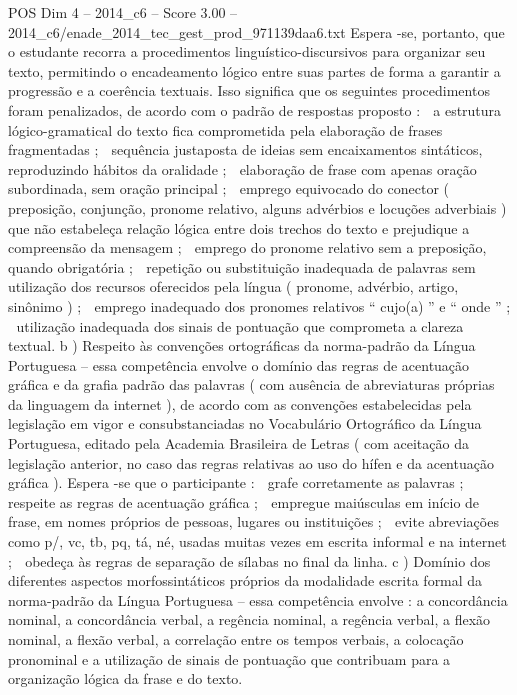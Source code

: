 \begin{textsample}{POS Dim 4 – 2014\_c6 – Score 3.00 – 2014\_c6/enade\_2014\_tec\_gest\_prod\_971139daa6.txt}
Espera -se, portanto, que o estudante recorra a procedimentos linguístico-discursivos para organizar seu texto, permitindo o encadeamento lógico entre suas partes de forma a garantir a progressão e a coerência textuais.
Isso significa que os seguintes procedimentos foram penalizados, de acordo com o padrão de respostas proposto :  a estrutura lógico-gramatical do texto fica comprometida pela elaboração de frases fragmentadas ;  sequência justaposta de ideias sem encaixamentos sintáticos, reproduzindo hábitos da oralidade ;  elaboração de frase com apenas oração subordinada, sem oração principal ;  emprego equivocado do conector ( preposição, conjunção, pronome relativo, alguns advérbios e locuções adverbiais ) que não estabeleça relação lógica entre dois trechos do texto e prejudique a compreensão da mensagem ;  emprego do pronome relativo sem a preposição, quando obrigatória ;  repetição ou substituição inadequada de palavras sem utilização dos recursos oferecidos pela língua ( pronome, advérbio, artigo, sinônimo ) ;  emprego inadequado dos pronomes relativos “ cujo(a) ” e “ onde ” ;  utilização inadequada dos sinais de pontuação que comprometa a clareza textual. b ) Respeito às convenções ortográficas da norma-padrão da Língua Portuguesa – essa competência envolve o domínio das regras de acentuação gráfica e da grafia padrão das palavras ( com ausência de abreviaturas próprias da linguagem da internet ), de acordo com as convenções estabelecidas pela legislação em vigor e consubstanciadas no Vocabulário Ortográfico da Língua Portuguesa, editado pela Academia Brasileira de Letras ( com aceitação da legislação anterior, no caso das regras relativas ao uso do hífen e da acentuação gráfica ).
Espera -se que o participante :  grafe corretamente as palavras ;  respeite as regras de acentuação gráfica ;  empregue maiúsculas em início de frase, em nomes próprios de pessoas, lugares ou instituições ;  evite abreviações como p/, vc, tb, pq, tá, né, usadas muitas vezes em escrita informal e na internet ;  obedeça às regras de separação de sílabas no final da linha. c ) Domínio dos diferentes aspectos morfossintáticos próprios da modalidade escrita formal da norma-padrão da Língua Portuguesa – essa competência envolve : a concordância nominal, a concordância verbal, a regência nominal, a regência verbal, a flexão nominal, a flexão verbal, a correlação entre os tempos verbais, a colocação pronominal e a utilização de sinais de pontuação que contribuam para a organização lógica da frase e do texto.

\end{textsample}
